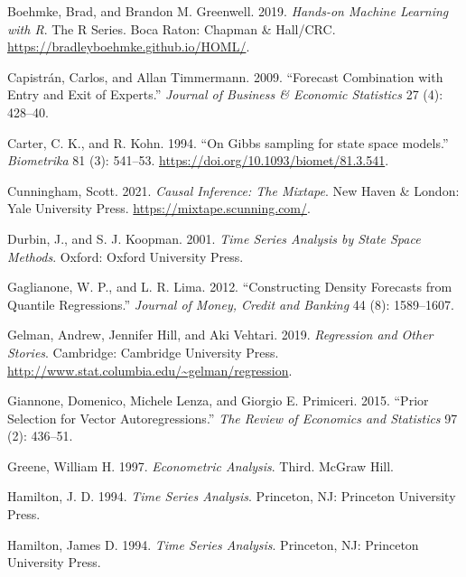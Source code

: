 \documentclass[
  letterpaper,
]{book}
\newlength{\cslhangindent}
\newlength{\cslentryspacingunit} %
\newenvironment{CSLReferences}[2] %
 {%
  \setlength{\parindent}{0pt}
  \ifodd #1
  \let\oldpar\par
  \def\par{\hangindent=\cslhangindent\oldpar}
  \fi
  \setlength{\parskip}{#2\cslentryspacingunit}
 }%
 {}
\begin{document}
\begin{CSLReferences}{1}{0}
\leavevmode{}%
Boehmke, Brad, and Brandon M. Greenwell. 2019. \emph{Hands-on Machine
Learning with {R}}. The {R} Series. Boca Raton: Chapman \& Hall/CRC.
\url{https://bradleyboehmke.github.io/HOML/}.

\leavevmode{}%
Capistrán, Carlos, and Allan Timmermann. 2009. {``Forecast Combination
with Entry and Exit of Experts.''} \emph{Journal of Business \& Economic
Statistics} 27 (4): 428--40.

\leavevmode{}%
Carter, C. K., and R. Kohn. 1994. {``{On {G}ibbs sampling for state
space models}.''} \emph{Biometrika} 81 (3): 541--53.
\url{https://doi.org/10.1093/biomet/81.3.541}.

\leavevmode{}%
Cunningham, Scott. 2021. \emph{Causal Inference: The Mixtape}. New Haven
\& London: Yale University Press. \url{https://mixtape.scunning.com/}.

\leavevmode{}%
Durbin, J., and S. J. Koopman. 2001. \emph{Time Series Analysis by State
Space Methods}. Oxford: Oxford University Press.

\leavevmode{}%
Gaglianone, W. P., and L. R. Lima. 2012. {``Constructing Density
Forecasts from Quantile Regressions.''} \emph{Journal of Money, Credit
and Banking} 44 (8): 1589--1607.

\leavevmode{}%
Gelman, Andrew, Jennifer Hill, and Aki Vehtari. 2019. \emph{Regression
and Other Stories}. Cambridge: Cambridge University Press.
\url{http://www.stat.columbia.edu/~gelman/regression}.

\leavevmode{}%
Giannone, Domenico, Michele Lenza, and Giorgio E. Primiceri. 2015.
{``{Prior Selection for Vector Autoregressions}.''} \emph{The Review of
Economics and Statistics} 97 (2): 436--51.

\leavevmode{}%
Greene, William H. 1997. \emph{Econometric Analysis}. Third. McGraw
Hill.

\leavevmode{}%
Hamilton, J. D. 1994. \emph{Time Series Analysis}. Princeton, NJ:
Princeton University Press.

\leavevmode{}%
Hamilton, James D. 1994. \emph{Time Series Analysis}. Princeton, NJ:
Princeton University Press.


\end{CSLReferences}
\end{document}

